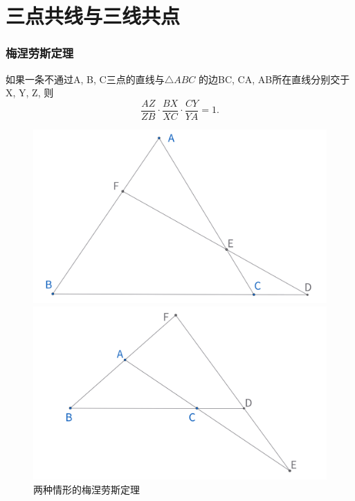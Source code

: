 \part{三点共线与三线共点}
\section{梅涅劳斯定理}
\begin{theorem}
    如果一条不通过A, B, C三点的直线与$\triangle ABC$ 的边BC, CA, AB所在直线分别交于X, Y, Z, 则 
    $$\frac{A Z}{Z B} \cdot \frac{B X}{X C} \cdot \frac{C Y}{Y A}=1.$$ 
\end{theorem}


\begin{figure}[H]
    \centering  
    \begin{minipage}[t]{0.45\textwidth}
        \centering
        \includegraphics[width=\linewidth]{figures/menelaus1.png}
    \end{minipage}
    \hfill %
    \begin{minipage}[t]{0.45\textwidth}
    \centering
    \includegraphics[width=\linewidth]{figures/menelaus2.png}
    \end{minipage}
    \caption{两种情形的梅涅劳斯定理}
\end{figure}


